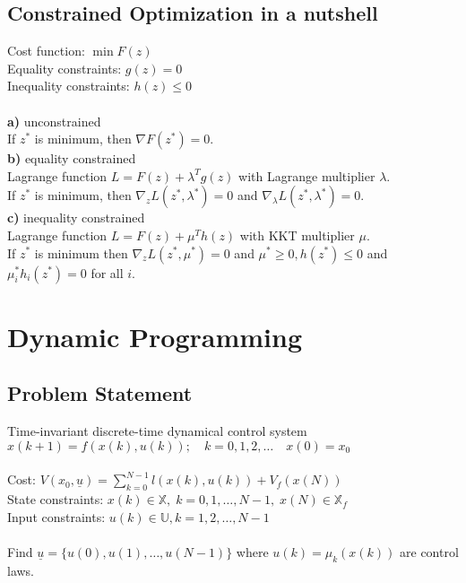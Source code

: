 \documentclass[english]{latex4ei/latex4ei_sheet}
\begin{document}
\begin{sectionbox}
\subsection{Constrained Optimization in a nutshell}
Cost function: $\min F(z)$\\
Equality constraints: $g(z)=0$\\
Inequality constraints: $h(z)\leq 0$\\
\\
\textbf{a)} unconstrained\\
If $z^*$ is minimum, then $\nabla F(z^*)=0$.\\
\textbf{b)} equality constrained\\
Lagrange function $L=F(z)+\lambda^{T} g(z)$ with Lagrange multiplier $\lambda$. \\ 
If $z^{*}$ is minimum, then $\nabla_{z} L\left(z^{*}, \lambda^{*}\right)=0$ and $\nabla_{\lambda} L\left(z^{*}, \lambda^{*}\right)=0$. \\
\textbf{c)} inequality constrained\\
Lagrange function $L=F(z)+\mu^{T} h(z)$ with KKT multiplier $\mu$. \\
If $z^{*}$ is minimum then $\nabla_{z} L\left(z^{*}, \mu^{*}\right)=0$ and $\mu^{*} \geq 0, h\left(z^{*}\right) \leq 0$ and $\mu_{i}^{*} h_{i}\left(z^{*}\right)=0$ for all $i$.

\section{Dynamic Programming}

\subsection{Problem Statement}
Time-invariant discrete-time dynamical control system\\
$x(k+1)=f(x(k), u(k)) ; \quad k=0,1,2, \ldots \quad x(0)=x_{0}$ \\ \\
Cost: $V\left(x_{0}, \underline{u}\right)=\sum\limits_{k=0}^{N-1} l(x(k), u(k))+V_{f}(x(N))$ \\
State constraints: $x(k) \in \mathbb{X},\; k=0,1, \ldots, N-1,\; x(N) \in \mathbb{X}_{f}$\\
Input constraints: $u(k) \in \mathbb{U}, k=1,2, \ldots, N-1$ \\ \\
Find $\underline{u}=\{u(0), u(1), \ldots, u(N-1)\}$ where $u(k)=\mu_{k}(x(k))$ are control laws.\\


\end{sectionbox}
\end{document}
